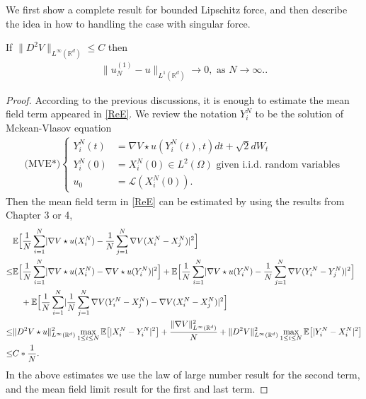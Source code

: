 We first show a complete result for bounded Lipschitz force, and then describe the idea in how to handling the case with singular force.
\begin{theorem}
  If $\|D^2V\|_{L^\infty(\mathbb{R}^d)} \le  C$  then 
  \begin{align*}
    \|u_N^{(1)} - u \|_{L^{1}(\mathbb{R}^{d} ) } \rightarrow 0, \mbox{ as } N\to \infty.
  .\end{align*}
\end{theorem}
\begin{proof}
	According to the previous discussions, it is enough to estimate the mean field term appeared in \autoref{ReE}. We review the notation $Y^N_i$ to be the solution of Mckean-Vlasov equation
 \begin{align*}
\text{(MVE*)}\begin{cases}
Y^N_i(t) &= \nabla V\star u(Y^N_i(t),t)dt + \sqrt{2} dW_t\\
Y^N_i(0) &= X^N_i(0) \in  L^{2}(\Omega ) \mbox{ given i.i.d. random variables}\\
u_0 &= \mathcal{L}(X^N_i(0)).
\end{cases}
\end{align*}
Then the mean field term in \autoref{ReE} can be estimated by using the results from Chapter 3 or 4,	
\begin{align*}
  &\mathbb{E}\Big[\frac{1}{N} \sum_{i=1}^{N} \lvert\nabla V \star  u (X_i^{N} ) - \frac{1}{N} \sum_{j=1}^{N} \nabla V (X_i^{N}-X_j^{N}  ) \rvert^2 \Big] \\
  \le & \mathbb{E}\Big[\frac{1}{N} \sum_{i=1}^{N} \lvert\nabla V \star  u(X_i^{N}) - \nabla V \star  u(Y_i^{N}  )\rvert^2 \Big] + \mathbb{E}\Big[\frac{1}{N} \sum_{i=1}^{N} \lvert\nabla V \star  u(Y_i^{N}  ) - \frac{1}{N} \sum_{j=1}^{N} \nabla V(Y_i^{N} - Y_j^{N}    ) \rvert^2 \Big]\\
  &\quad +  \mathbb{E}\Big[\frac{1}{N} \sum_{i=1}^{N} \lvert \frac{1}{N} \sum_{j=1}^{N}\nabla V(Y_i^{N} - X_j^{N} ) -\nabla V (X_i^{N} - X_j^{N}  )\rvert^2 \Big]  \\
  \le & \|D^2 V \star  u \|_{L^\infty(\mathbb{R}^d)}^{2} \max_{1\leq i\leq N} \mathbb{E}\big[\lvert X_i^{N} -Y_i^{N}  \rvert^2\big]  +  \frac{\|\nabla V\|^2_{L^\infty(\mathbb{R}^d)}}{N} + \|D^2V\|^2_{L^\infty(\mathbb{R}^d)} \max_{1\leq i\leq N} \mathbb{E}\big[\lvert Y^{N}_i - X_i^{N}   \rvert^2\big]\\
  \le & C*\frac{1}{N}.
\end{align*}
In the above estimates we use the law of large number result for the second term, and the mean field limit result for the first and last term.
\end{proof}

